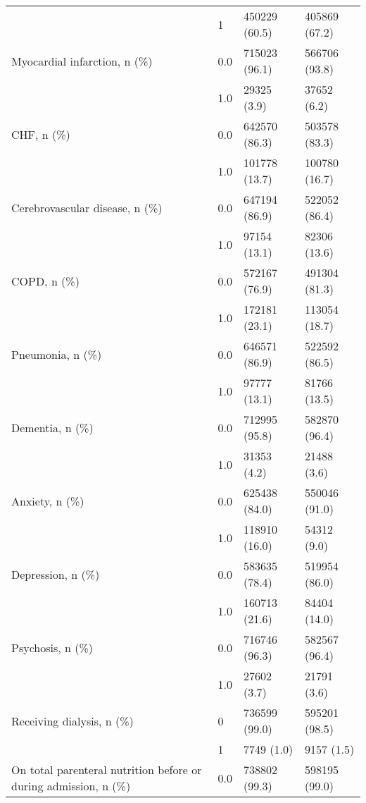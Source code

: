 \begin{tabular}{llll}
                                       & 1 &      450229 (60.5) &      405869 (67.2) \\
Myocardial infarction, n (\%) & 0.0 &      715023 (96.1) &      566706 (93.8) \\
                                       & 1.0 &        29325 (3.9) &        37652 (6.2) \\
CHF, n (\%) & 0.0 &      642570 (86.3) &      503578 (83.3) \\
                                       & 1.0 &      101778 (13.7) &      100780 (16.7) \\
Cerebrovascular disease, n (\%) & 0.0 &      647194 (86.9) &      522052 (86.4) \\
                                       & 1.0 &       97154 (13.1) &       82306 (13.6) \\
COPD, n (\%) & 0.0 &      572167 (76.9) &      491304 (81.3) \\
                                       & 1.0 &      172181 (23.1) &      113054 (18.7) \\
Pneumonia, n (\%) & 0.0 &      646571 (86.9) &      522592 (86.5) \\
                                       & 1.0 &       97777 (13.1) &       81766 (13.5) \\
Dementia, n (\%) & 0.0 &      712995 (95.8) &      582870 (96.4) \\
                                       & 1.0 &        31353 (4.2) &        21488 (3.6) \\
Anxiety, n (\%) & 0.0 &      625438 (84.0) &      550046 (91.0) \\
                                       & 1.0 &      118910 (16.0) &        54312 (9.0) \\
Depression, n (\%) & 0.0 &      583635 (78.4) &      519954 (86.0) \\
                                       & 1.0 &      160713 (21.6) &       84404 (14.0) \\
Psychosis, n (\%) & 0.0 &      716746 (96.3) &      582567 (96.4) \\
                                       & 1.0 &        27602 (3.7) &        21791 (3.6) \\
Receiving dialysis, n (\%) & 0 &      736599 (99.0) &      595201 (98.5) \\
                                       & 1 &         7749 (1.0) &         9157 (1.5) \\
On total parenteral nutrition before or during admission, n (\%) & 0.0 &      738802 (99.3) &      598195 (99.0) \\

\end{tabular}
